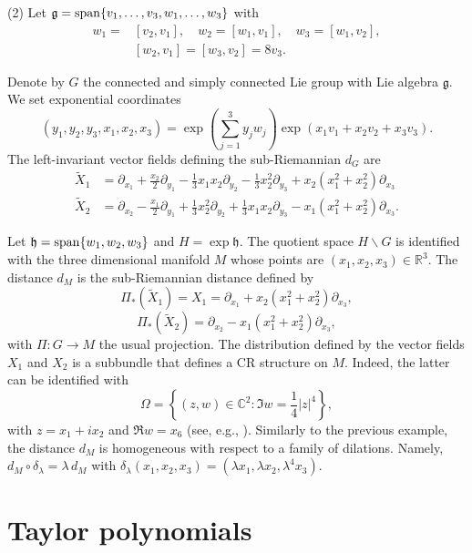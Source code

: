 \documentclass[12pt]{amsart}
\begin{document}
\vskip0.2cm 
(2) Let 
$\mathfrak{g}={\rm span} \{ v_1,\dots, v_3, w_1,\dots, w_3\}$ with
\begin{align*}
     w_1=&[ v_2, v_1], \quad  w_2=[ w_1, v_1], \quad  w_3=[ w_1, v_2],\\
    &[ w_2, v_1]=[ w_3, v_2]=8 v_3.
\end{align*}

Denote by $G$ the connected and simply connected Lie group with Lie algebra $\mathfrak{g}$. 
 We set  exponential coordinates 
\[
(y_1,y_2,y_3,x_1,x_2,x_3)= \exp\left(\sum_{j=1}^{3}y_j w_j\right)\exp\left(x_1 v_1+x_2 v_2+x_3 v_3\right).
\]
The left-invariant vector fields defining the sub-Riemannian $d_G$ are 
\begin{align*}
{\tilde X}_1 &=  \partial_{x_1}+ \frac{x_2}{2}\partial_{y_1}-\frac{1}{3}x_1x_2 \partial_{y_2}-\frac{1}{3}x^2_2 \partial_{y_3}+x_2(x_1^2+x_2^2) \partial_{x_3}
\\
{\tilde X}_2 &=  \partial_{x_2}- \frac{x_1}{2}\partial_{y_1}+\frac{1}{3}x^2_2 \partial_{y_2}+\frac{1}{3}x_1x_2 \partial_{y_3}-x_1(x_1^2+x_2^2) \partial_{x_3}.
\end{align*}



Let $\mathfrak{h}={\rm span} \{w_1,w_2,w_3\}$ and $H=\exp \mathfrak h$.
The quotient space $H\backslash G$ is identified with the three dimensional manifold $M$ whose points are $(x_1,x_2,x_3)\in \mathbb R ^3$. The distance $d_M$ is the sub-Riemannian distance defined by
 \[ 
 \Pi_*(\tilde X_1) = {X}_1= \partial_{x_1}+x_2(x_1^2+x_2^2) \partial_{x_3}, 
 \]
 \[ 
 \Pi_*(\tilde X_2)= \partial_{x_2} -x_1(x_1^2+x_2^2) \partial_{x_3},
 \]
    with $\Pi: G\to M$ the usual projection.
 The distribution defined by the vector fields $X_1$ and $X_2$ is a subbundle that defines a CR structure on $M$. Indeed, the latter can be identified with
\[\Omega= \left\{(z,w)\in {\mathbb C}  ^2: \Im w = \frac{1}{4}|z|^{4}\right\},
\]
with $z=x_1+ix_2$ and $\Re w=x_6$ (see, e.g., \cite{CRembedding, CLOW}).
Similarly to the previous example, the distance $d_M$ is homogeneous with respect to a family of dilations. Namely, $d_M\circ\delta_\lambda = \lambda\, d_M$ with $\delta_\lambda(x_1,x_2,x_3)=(\lambda x_1,\lambda x_2,\lambda^4 x_3)$.



\section{Taylor polynomials}\label{TaylorPol}
\end{document}
